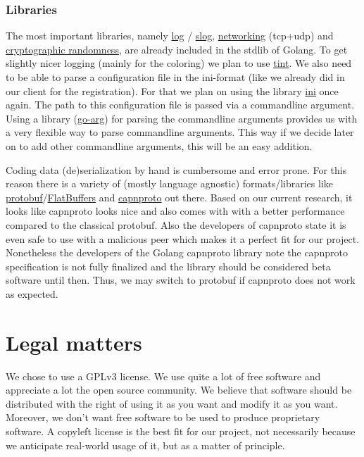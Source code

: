 \documentclass[a4paper,english,10pt,NET]{tumarticle}
\begin{document}
\subsubsection{Libraries}
The most important libraries, namely
\href{https://pkg.go.dev/log}{log}
/
\href{https://pkg.go.dev/log/slog@go1.22.2}{slog},
\href{https://pkg.go.dev/net}{networking} (tcp+udp)
and
\href{https://pkg.go.dev/crypto/rand}{cryptographic randomness},
are already included in the stdlib of Golang.
To get slightly nicer logging (mainly for the coloring) we plan to use \href{github.com/lmittmann/tint}{tint}.
We also need to be able to parse a configuration file in the ini-format (like we already did in our client for the registration).
For that we plan on using the library \href{gopkg.in/ini.v1}{ini} once again.
The path to this configuration file is passed via a commandline argument.
Using a library (\href{https://github.com/alexflint/go-arg}{go-arg}) for parsing the commandline arguments provides us with a very flexible way to parse commandline arguments.
This way if we decide later on to add other commandline arguments, this will be an easy addition.

Coding data (de)serialization by hand is cumbersome and error prone.
For this reason there is a variety of (mostly language agnostic) formats/libraries like \href{https://protobuf.dev/}{protobuf}/\href{https://flatbuffers.dev/}{FlatBuffers} and \href{https://capnproto.org/}{capnproto} out there.
Based on our current research, it looks like capnproto looks nice and also comes with with a better performance compared to the classical protobuf.
Also the developers of capnproto state it is even safe to use with a malicious peer which makes it a perfect fit for our project.
Nonetheless the developers of the Golang capnproto library note the capnproto specification is not fully finalized and the library should be considered beta software until then.
Thus, we may switch to protobuf if capnproto does not work as expected.

\section{Legal matters}


We chose to use a GPLv3 license.
We use quite a lot of free software and appreciate a lot the open source community. We believe that software should be distributed with the right of using it as you want and modify it as you want. Moreover, we don't want free software to be used to produce proprietary software. A copyleft license is the best fit for our project, not necessarily because we anticipate real-world usage of it, but as a matter of principle.
\end{document}
